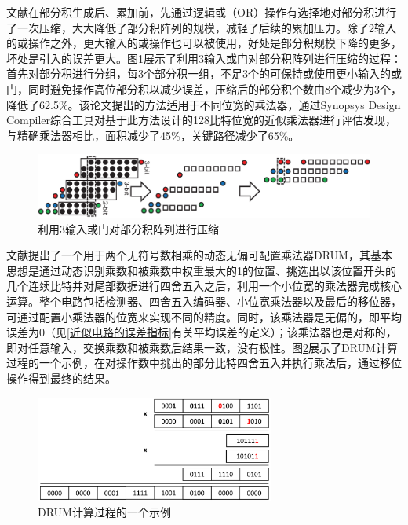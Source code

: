 文献\cite{AC:AM:SDLC}在部分积生成后、累加前，先通过逻辑或（OR）操作有选择地对部分积进行了一次压缩，大大降低了部分积阵列的规模，减轻了后续的累加压力。除了2输入的或操作之外，更大输入的或操作也可以被使用，好处是部分积规模下降的更多，坏处是引入的误差更大。图\ref{AC:AM:Fig:SDLC_OR3}展示了利用3输入或门对部分积阵列进行压缩的过程：首先对部分积进行分组，每3个部分积一组，不足3个的可保持或使用更小输入的或门，同时避免操作高位部分积以减少误差，压缩后的部分积个数由8个减少为3个，降低了62.5\%。该论文提出的方法适用于不同位宽的乘法器，通过Synopsys Design Compiler综合工具对基于此方法设计的128比特位宽的近似乘法器进行评估发现，与精确乘法器相比，面积减少了45\%，关键路径减少了65\%。
\begin{figure}[!htb]
    \centering
    \includegraphics[width=\textwidth]{figs/AC-AM-SDLC_OR3.png}
    \caption{利用3输入或门对部分积阵列进行压缩}
\label{AC:AM:Fig:SDLC_OR3}
\end{figure}

文献\cite{AC:AM:DRUM}提出了一个用于两个无符号数相乘的动态无偏可配置乘法器DRUM，其基本思想是通过动态识别乘数和被乘数中权重最大的1的位置、挑选出以该位置开头的几个连续比特并对尾部数据进行四舍五入之后，利用一个小位宽的乘法器完成核心运算。整个电路包括检测器、四舍五入编码器、小位宽乘法器以及最后的移位器，可通过配置小乘法器的位宽来实现不同的精度。同时，该乘法器是无偏的，即平均误差为0（见\ref{近似电路的误差指标}有关平均误差的定义）；该乘法器也是对称的，即对任意输入，交换乘数和被乘数后结果一致，没有极性。图\ref{AC:AM:Fig:DRUM_example}展示了DRUM计算过程的一个示例，在对操作数中挑出的部分比特四舍五入并执行乘法后，通过移位操作得到最终的结果。
\begin{figure}[!htb]
    \centering
    \includegraphics[width=0.7\textwidth]{figs/AC-AM-DRUM_example.png}
    \caption{DRUM计算过程的一个示例}
\label{AC:AM:Fig:DRUM_example}
\end{figure}

